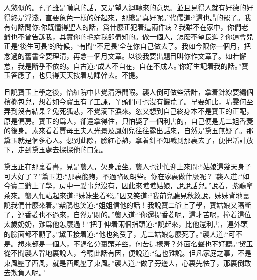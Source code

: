 \begin{parag}
人慾似的。孔子雖是嘆息的話，又是望人迴轉來的意思。並且見得人就有好德的好得終是浮淺，直要象色一樣的好起來，那纔是真好呢。”代儒道:“這也講的罷了。我有句話問你:你既懂得聖人的話，爲什麼正犯着這兩件病？我雖不在家中，你們老爺也不曾告訴我，其實你的毛病我卻盡知的。做一個人，怎麼不望長進？你這會兒正是‘後生可畏’的時候，‘有聞’‘不足畏’全在你自己做去了。我如今限你一個月，把念過的舊書全要理清，再念一個月文章。以後我要出題目叫你作文章了。如若懈怠，我是斷乎不依的。自古道:‘成人不自在，自在不成人。’你好生記着我的話。”寶玉答應了，也只得天天按着功課幹去。不提。
\end{parag}


\begin{parag}
    且說寶玉上學之後，怡紅院中甚覺清淨閒暇。襲人倒可做些活計，拿着針線要繡個檳榔包兒，想着如今寶玉有了工課，丫頭們可也沒有饑荒了。早要如此，晴雯何至弄到沒有結果？兔死狐悲，不覺滴下淚來。忽又想到自己終身本不是寶玉的正配，原是偏房。寶玉的爲人，卻還拿得住，只怕娶了一個利害的，自己便是尤二姐香菱的後身。素來看着賈母王夫人光景及鳳姐兒往往露出話來，自然是黛玉無疑了。那黛玉就是個多心人。想到此際，臉紅心熱，拿着針不知戳到那裏去了，便把活計放下，走到黛玉處去探探他的口氣。
\end{parag}


\begin{parag}
    黛玉正在那裏看書，見是襲人，欠身讓坐。襲人也連忙迎上來問:“姑娘這幾天身子可大好了？”黛玉道:“那裏能夠，不過略硬朗些。你在家裏做什麼呢？”襲人道:“如今寶二爺上了學，房中一點事兒沒有，因此來瞧瞧姑娘，說說話兒。”說着，紫鵑拿茶來。襲人忙站起來道:“妹妹坐着罷。”因又笑道:“我前兒聽見秋紋說，妹妹背地裏說我們什麼來着。”紫鵑也笑道:“姐姐信他的話！我說寶二爺上了學，寶姑娘又隔斷了，連香菱也不過來，自然是悶的。”襲人道:“你還提香菱呢，這才苦呢，撞着這位太歲奶奶，難爲他怎麼過！”把手伸着兩個指頭道:“說起來，比他還利害，連外頭的臉面都不顧了。”黛玉接着道:“他也夠受了，尤二姑娘怎麼死了。”襲人道:“可不是。想來都是一個人，不過名分裏頭差些，何苦這樣毒？外面名聲也不好聽。”黛玉從不聞襲人背地裏說人，今聽此話有因，便說道:“這也難說。但凡家庭之事，不是東風壓了西風，就是西風壓了東風。”襲人道:“做了旁邊人，心裏先怯了，那裏倒敢去欺負人呢。”
\end{parag}



